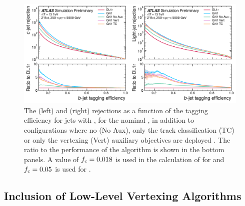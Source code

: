 \begin{figure}[!p]
    \centering
    \includegraphics[width=\textwidth]{chapters/gnn_tagger/figs/results/ablations/zprime/zprime_roc_btag.pdf}
    \caption{The \cjet (left) and \ljet (right) rejections as a function of the \bjet tagging efficiency for \Zprime jets with \Zprimept, for the nominal \GNN, in addition to configurations where no (\GNN No Aux), only the track classification (\GNN TC) or only the vertexing (\GNN Vert) auxiliary objectives are deployed \cite{ATL-PHYS-PUB-2022-027}. The ratio to the performance of the \DLr algorithm is shown in the bottom panels. A value of $f_c = 0.018$ is used in the calculation of \Db for \DLr and $f_c = 0.05$ is used for \GNN.}
    \label{fig:zprime_btag_roc_ab}
\end{figure}


\subsection{Inclusion of Low-Level Vertexing Algorithms}\label{sec:gnn_low_level_vert_impact}

